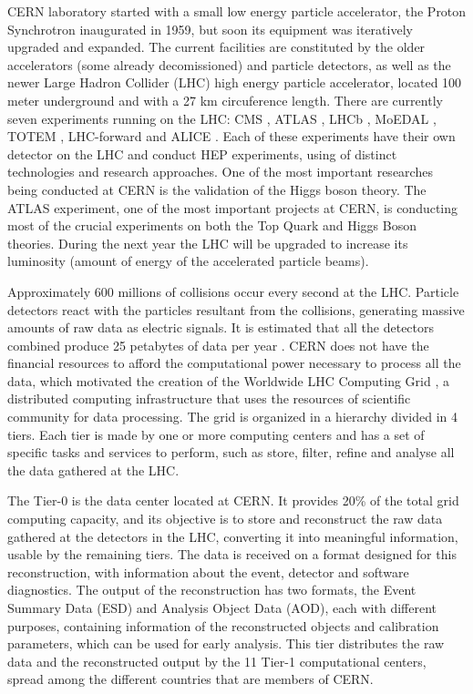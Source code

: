 CERN laboratory started with a small low energy particle accelerator, the Proton Synchrotron \cite{CERN:PS} inaugurated in 1959, but soon its equipment was iteratively upgraded and expanded. The current facilities are constituted by the older accelerators (some already decomissioned) and particle detectors, as well as the newer Large Hadron Collider (LHC) \cite{CERN:LHC} high energy particle accelerator, located 100 meter underground and with a 27 km circuference length. There are currently seven experiments running on the LHC: CMS \cite{CERN:CMS}, ATLAS \cite{CERN:ATLAS}, LHCb \cite{CERN:LHCb}, MoEDAL \cite{CERN:MoEDAL}, TOTEM \cite{CERN:TOTEM}, LHC-forward \cite{CERN:LHCf} and ALICE \cite{CERN:ALICE}. Each of these experiments have their own detector on the LHC and conduct HEP experiments, using of distinct technologies and research approaches. One of the most important researches being conducted at CERN is the validation of the Higgs boson theory. The ATLAS experiment, one of the most important projects at CERN, is conducting most of the crucial experiments on both the Top Quark and Higgs Boson theories. During the next year the LHC will be upgraded to increase its luminosity (amount of energy of the accelerated particle beams).

Approximately 600 millions of collisions occur every second at the LHC. Particle detectors react with the particles resultant from the collisions, generating massive amounts of raw data as electric signals. It is estimated that all the detectors combined produce 25 petabytes of data per year \cite{CERN:DATA1,CERN:DATA2}. CERN does not have the financial resources to afford the computational power necessary to process all the data, which motivated the creation of the Worldwide LHC Computing Grid \cite{CERN:WLHCCG}, a distributed computing infrastructure that uses the resources of scientific community for data processing. The grid is organized in a hierarchy divided in 4 tiers. Each tier is made by one or more computing centers and has a set of specific tasks and services to perform, such as store, filter, refine and analyse all the data gathered at the LHC.

The Tier-0 is the data center located at CERN. It provides 20\% of the total grid computing capacity, and its objective is to store and reconstruct the raw data gathered at the detectors in the LHC, converting it into meaningful information, usable by the remaining tiers. The data is received on a format designed for this reconstruction, with information about the event, detector and software diagnostics. The output of the reconstruction has two formats, the Event Summary Data (ESD) and Analysis Object Data (AOD), each with different purposes, containing information of the reconstructed objects and calibration parameters, which can be used for early analysis. This tier distributes the raw data and the reconstructed output by the 11 Tier-1 computational centers, spread among the different countries that are members of CERN.

